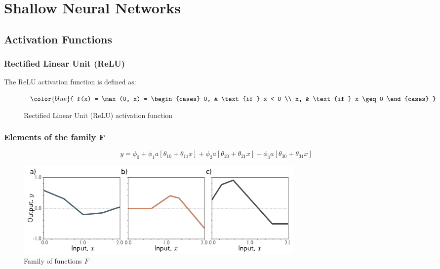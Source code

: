 \chapter{Shallow Neural Networks}
\section{Activation Functions}

\subsection{Rectified Linear Unit (ReLU)}

The ReLU activation function is defined as:

\begin{figure}[ht]
\centering
\begin{minipage}{0.4\textwidth}
\end{minipage}%
\begin{minipage}{0.4\textwidth}
$
\color{blue}{
f(x) = \max(0, x) = 
\begin{cases}
0, & \text{if } x < 0 \\
x, & \text{if } x \geq 0
\end{cases}
}
$
\end{minipage}
\caption{Rectified Linear Unit (ReLU) activation function}
\label{fig:relu}
\end{figure}

\subsection{Elements of the family F}

$$
y = \phi_0 + \phi_1 a[\theta_{10} + \theta_{11} x] + \phi_2 a[\theta_{20} + \theta_{21} x] + \phi_3 a[\theta_{30} + \theta_{31} x]
$$

\begin{figure}[H]
    \centering
    \includegraphics[width=0.7\textwidth]{assets/abc_foo.png}
    \caption{Family of functions $F$}
    \label{fig:family_f}
\end{figure}

